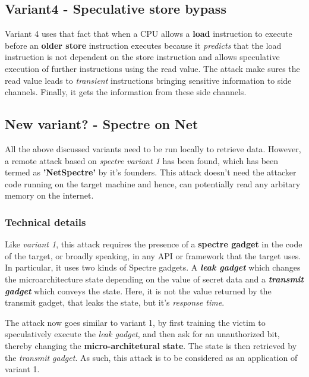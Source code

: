 \documentclass[12pt]{article}
\begin{document}
\subsection{Variant4 - Speculative store bypass}

Variant 4 uses that fact that when a CPU allows a \textbf{load} instruction to execute before an \textbf{older store} instruction executes because it \textit{predicts} that the load instruction is not dependent on the store instruction and allows speculative execution of further instructions using the read value.
The attack make sures the read value leads to \textit{transient} instructions bringing sensitive information to side channels. Finally, it gets the information from these side channels.
\subsection{New variant? - Spectre on Net}
All the above discussed variants need to be run locally to retrieve data. However, a remote attack based on \textit{spectre variant 1} has been found, which has been termed as \textbf{'NetSpectre'} by it's founders. This attack doesn't need the attacker code running on the target machine and hence, can potentially read any arbitary memory on the internet.  
\subsubsection{Technical details}
Like \textit{variant 1}, this attack requires the presence of a \textbf{spectre gadget} in the code of the target, or broadly speaking, in any API or framework that the target uses. In particular, it uses two kinds of Spectre gadgets. A \textbf{\textit{leak gadget}} which changes the microarchitecture state depending on the value of secret data and a \textbf{\textit{transmit gadget}} which conveys the state. Here, it is not the value returned by the transmit gadget, that leaks the state, but it's \textit{response time}.

The attack now goes similar to variant 1, by first training the victim to speculatively execute the \textit{leak gadget}, and then ask for an unauthorized bit, thereby changing the \textbf{micro-architetural state}. The state is then retrieved by the \textit{transmit gadget}. As such, this attack is to be considered as an application of variant 1. 
\end{document}
